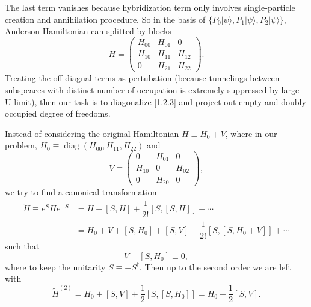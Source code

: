 \documentclass[aps,prx,superscriptaddress,onecolumn,preprintnumbers,nofootinbib,longbibliography]{revtex4-1}
\begin{document}
		The last term vanishes because hybridization term only involves single-particle creation and annihilation procedure. So in the basis of $\{P_0|\psi\rangle,P_1|\psi\rangle,P_2|\psi\rangle\}$, Anderson Hamiltonian can splitted by blocks
		\begin{equation}\label{1.2.3}
			H=\left(\begin{array}{ccc}
				H_{00}&H_{01}&0\\H_{10}&H_{11}&H_{12}\\0&H_{21}&H_{22}
			\end{array}\right).
		\end{equation}
		Treating the off-diagnal terms as pertubation (because tunnelings between subspcaces with distinct number of occupation is extremely suppressed by large-U limit), then our task is to diagonalize \eqref{1.2.3} and project out empty and doubly occupied degree of freedoms.\par
		Instead of considering the original Hamiltonian $H\equiv H_0+V$, where in our problem, $H_0\equiv\mathrm{\mathop{diag}}(H_{00},H_{11},H_{22})$ and 
		\begin{equation*}
			V\equiv\left(\begin{array}{ccc}
				0&H_{01}&0\\H_{10}&0&H_{02}\\0&H_{20}&0
			\end{array}\right),
		\end{equation*}
		we try to find a canonical transformation
		\begin{align}
			\widetilde{H}\equiv e^{S}He^{-S}&=H+[S,H]+\dfrac{1}{2!}[S,[S,H]]+\cdots\nonumber\\
			&=H_0+V+[S,H_0]+[S,V]+\dfrac{1}{2!}[S,[S,H_0+V]]+\cdots\label{1.2.4}
		\end{align}
		such that
		\begin{equation}\label{1.2.5}
			V+[S,H_0]\equiv0,
		\end{equation}
		where to keep the unitarity $S\equiv-S^\dagger$. Then up to the second order we are left with
		\begin{equation}\label{1.2.6}
			\widetilde{H}^{(2)}=H_0+[S,V]+\dfrac{1}{2}[S,[S,H_0]]=H_0+\dfrac{1}{2}[S,V].
		\end{equation}
\end{document}
